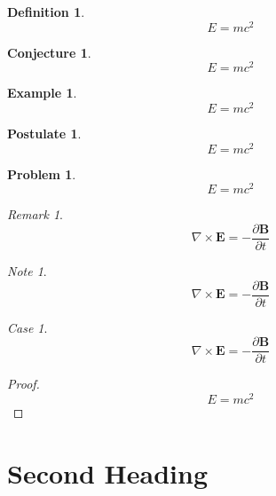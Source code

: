 \documentclass[english,oneside, article]{memoir}
\theoremstyle{plain}
\theoremstyle{definition}
\newtheorem{Definition}{Definition}[chapter]
\newtheorem{Conjecture}{Conjecture}[chapter]
\newtheorem{Example}{Example}[chapter]
\newtheorem{Postulate}{Postulate}[chapter]
\newtheorem{Problem}{Problem}[chapter]
\theoremstyle{remark}
\newtheorem{Case}{Case}[chapter]
\newtheorem*{Remark}{Remark}
\newtheorem*{Note}{Note}
\begin{document}
\begin{Definition}

\[E=mc^2\]

\end{Definition}

\begin{Conjecture}

\[E=mc^2\]

\end{Conjecture}

\begin{Example}

\[E=mc^2\]

\end{Example}

\begin{Postulate}

\[E=mc^2\]

\end{Postulate}

\begin{Problem}

\[E=mc^2\]

\end{Problem}

\begin{Remark}

\[\nabla \times \mathbf{E} = - \frac{\partial \mathbf{B}}{\partial t}\]

\end{Remark}

\begin{Note}

\[\nabla \times \mathbf{E} = - \frac{\partial \mathbf{B}}{\partial t}\]

\end{Note}

\begin{Case}

\[\nabla \times \mathbf{E} = - \frac{\partial \mathbf{B}}{\partial t}\]

\end{Case}

\begin{proof}

\[E=mc^2\]

\end{proof}

\chapter{Second Heading}\label{second-heading}
\end{document}
